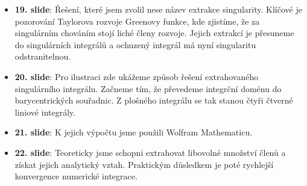 \documentclass[12pt]{article}
\begin{document}
\begin{itemize}
        \item \textbf{19. slide}: Řešení, které jsem zvolil nese název extrakce singularity. Klíčové je pozorování Taylorova rozvoje Greenovy funkce, kde zjistíme, že za singulárním chováním stojí liché členy rozvoje. Jejich extrakcí je přesuneme do singulárních integrálů a ochuzený integrál má nyní singularitu odstranitelnou.
        \item \textbf{20. slide}: Pro ilustraci zde ukážeme způsob řešení extrahovaného singulárního integrálu. Začneme tím, že převedeme integrční doménu do barycentrických souřadnic. Z plošného integrálu se tak stanou čtyři čtverné liniové integrály.
        \item \textbf{21. slide}: K jejich výpočtu jsme použili Wolfram Mathematicu.
        \item \textbf{22. slide}: Teoreticky jsme schopni extrahovat libovolné množství členů a získat jejich analytický vztah. Praktickým důsledkem je poté rychlejší konvergence numerické integrace.
    \end{itemize}
\end{document}
